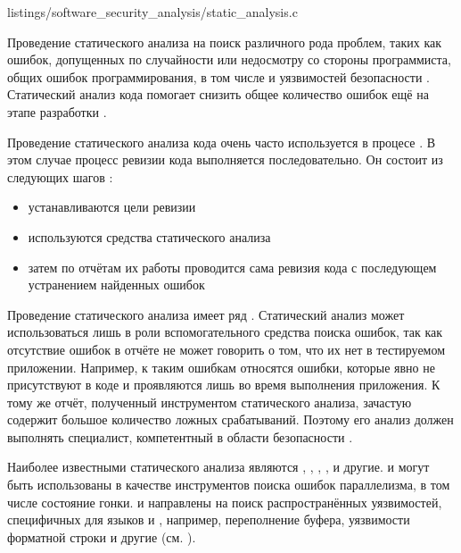 	{listings/software_security_analysis/static_analysis.c}

%
Проведение статического анализа  на поиск различного рода проблем, таких как ошибок, допущенных по случайности или недосмотру со стороны программиста, общих ошибок программирования, в том числе и уязвимостей безопасности . 
%
Статический анализ кода помогает снизить общее количество ошибок ещё на этапе разработки 
.

%
Проведение статического анализа кода очень часто используется в процесе . 
%
В этом случае процесс ревизии кода выполняется последовательно. 
%
Он состоит из следующих шагов : 
\begin{itemize}
	\item устанавливаются цели ревизии
	\item используются средства статического анализа
	\item затем по отчётам их работы проводится сама ревизия кода с последующем устранением найденных ошибок 
\end{itemize}

%
Проведение статического анализа имеет ряд   . 
%
Статический анализ может использоваться лишь в роли вспомогательного средства поиска ошибок, так как отсутствие ошибок в отчёте не может говорить о том, что их нет в тестируемом приложении. 
%
Например, к таким ошибкам относятся ошибки, которые явно не присутствуют в коде и проявляются лишь во время выполнения приложения. 
%
К тому же отчёт, полученный инструментом статического анализа, зачастую содержит большое количество ложных срабатываний. 
%
Поэтому его анализ должен выполнять специалист, компетентный в области безопасности .

%
Наиболее известными  статического анализа являются  ,  ,  ,  ,   и другие. 
%
 и  могут быть использованы в качестве инструментов поиска ошибок параллелизма, в том числе состояние гонки. 
%
 и  направлены на поиск распространённых уязвимостей, специфичных для языков  и , например, переполнение буфера, уязвимости форматной строки и другие (см. ).

